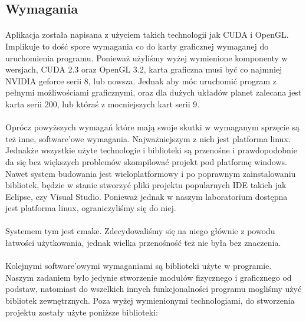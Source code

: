 \subsection{Wymagania}\label{sub:wymagania}
\paragraph{}

Aplikacja została napisana z użyciem takich technologii jak CUDA i OpenGL. Implikuje to dość spore wymagania co do karty graficznej wymaganej do uruchomienia programu. Ponieważ użyliśmy wyżej wymienione komponenty w wersjach, CUDA 2.3 oraz OpenGL 3.2, karta graficzna musi być co najmniej NVIDIA geforce serii 8, lub nowsza. Jednak aby móc uruchomić program z pełnymi możliwościami graficznymi, oraz dla dużych układów planet zalecana jest karta serii 200, lub któraś z mocniejszych kart serii 9.

\paragraph{}

Oprócz powyższych wymagań które mają swoje skutki w wymaganym sprzęcie są też inne, software'owe wymagania. Najważniejszym z nich jest platforma linux. Jednakże wszystkie użyte technologie i biblioteki są przenośne i prawdopodobnie da się bez większych problemów skompilować projekt pod platformę windows. Nawet system budowania jest wieloplatformowy i po poprawnym zainstalowaniu bibliotek, będzie w stanie stworzyć pliki projektu popularnych IDE takich jak Eclipse, czy Visual Studio. Ponieważ jednak w naszym laboratorium dostępna jest platforma linux, ograniczyliśmy się do niej.

\paragraph{}

Systemem tym jest cmake. Zdecydowaliśmy się na niego głównie z powodu łatwości użytkowania, jednak wielka przenośność też nie była bez znaczenia.

\paragraph{}

Kolejnymi software'owymi wymaganiami są biblioteki użyte w programie. Naszym zadaniem było jedynie stworzenie modułów fizycznego i graficznego od podstaw, natomiast do wszelkich innych funkcjonalności programu mogliśmy użyć bibliotek zewnętrznych. Poza wyżej wymienionymi technologiami, do stworzenia projektu zostały użyte poniższe biblioteki:

